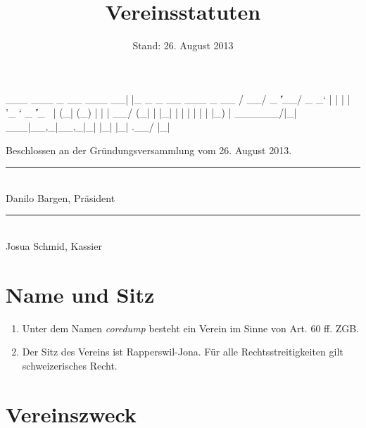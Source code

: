 \documentclass[10pt,a4paper,parskip,fleqn]{scrartcl}
\title{\Huge Vereinsstatuten}
\date{Stand: 26. August 2013}
\newcommand{\ol}{\begin{enumerate}[itemsep=-0.2em,topsep=-0.2em]}
\newcommand{\lo}{\end{enumerate}}
\newcommand{\li}{\item}
\begin{document}
\begin{verbbox}
  ___ ___  _ __ ___  __| |_   _ _ __ ___  _ __  
 / __/ _ \| '__/ _ \/ _` | | | | '_ ` _ \| '_ \ 
| (_| (_) | | |  __/ (_| | |_| | | | | | | |_) |
 \___\___/|_|  \___|\__,_|\__,_|_| |_| |_| .__/ 
                                         |_|    
\end{verbbox}

\begin{titlepage}

	\maketitle
	\thispagestyle{empty} %

  \begin{center}

		\vspace{1cm}

		\theverbbox

		\vfill

		\large Beschlossen an der Gründungsversammlung vom 26. August 2013.

		\vspace{1.5cm}

		\begin{minipage}[t]{0.49\textwidth}
			\center
			\rule{5cm}{0.2mm}\\
			Danilo Bargen, Präsident
		\end{minipage}
		\begin{minipage}[t]{0.49\textwidth}
			\center
			\rule{5cm}{0.2mm}\\
			Josua Schmid, Kassier
		\end{minipage}

  \end{center}

\end{titlepage}


\section{Name und Sitz}

\ol
	\li Unter dem Namen \textit{coredump} besteht ein Verein im Sinne von Art. 60
	ff. ZGB.
	\li Der Sitz des Vereins ist Rapperswil-Jona. Für alle Rechtsstreitigkeiten
	gilt schweizerisches Recht.
\lo


\section{Vereinszweck}
\end{document}
